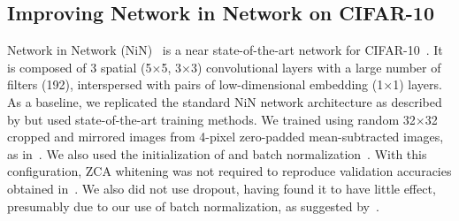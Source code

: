 \documentclass[thesis]{subfiles}
\begin{document}
	\subsection{Improving Network in Network on CIFAR-10}
	Network in Network (NiN)~\cite{Lin2013NiN} is a near state-of-the-art network for CIFAR-10~\cite{CIFAR10}. It is composed of 3 spatial (5$\times$5, 3$\times$3) convolutional layers with a large number of filters (192), interspersed with pairs of low-dimensional embedding (1$\times$1) layers. As a baseline, we replicated the standard NiN network architecture as described by \citet{Lin2013NiN} but used state-of-the-art training methods. We trained using random 32$\times$32 cropped and mirrored images from 4-pixel zero-padded  mean-subtracted images, as in~\citep{goodfellow2013maxout, He2015}. We also used the initialization of \citet{He2015b} and batch normalization~\citep{Ioffe2015}. With this configuration, ZCA whitening was not required to reproduce validation accuracies obtained in~\citep{Lin2013NiN}. We also did not use dropout, having found it to have little effect, presumably due to our use of batch normalization, as suggested by~\citet{Ioffe2015}.
	
\end{document}
